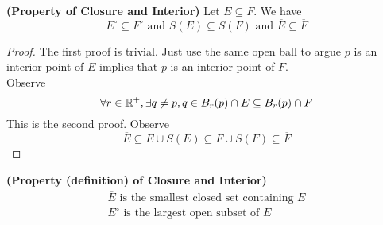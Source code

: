 \documentclass{report}
\begin{document}
\begin{theorem}
\label{2.7.17}
\textbf{(Property of Closure and Interior)} Let $E\subseteq F$. We have
\begin{equation}
E^\circ \subseteq F^\circ\text{ and }S(E)\subseteq S(F)\text{ and }\overline{E}\subseteq \overline{F}
\end{equation}
\end{theorem}
\begin{proof}
The first proof is trivial. Just use the same open ball to argue $p$ is an interior point of $E$ implies that $p$ is an interior point of $F$.\\

Observe 
\begin{equation}
\forall r\in\mathbb{R}^+,\exists q\neq p, q\in B_{r}(p)\cap E\subseteq B_{r}(p)\cap F
\end{equation}
This is the second proof. Observe
\begin{equation}
\overline{E}\subseteq E\cup S(E)\subseteq F\cup S(F)\subseteq \overline{F}
\end{equation}
\end{proof}
\begin{theorem}
\label{2.7.18}
\textbf{(Property (definition) of Closure and Interior)} 
\begin{gather}
\text{ $\overline{E}$ is the smallest closed set containing $E$ }\\
\text{ $E^\circ $ is the largest open subset of $E$ }
\end{gather}
\end{theorem}
\end{document}
